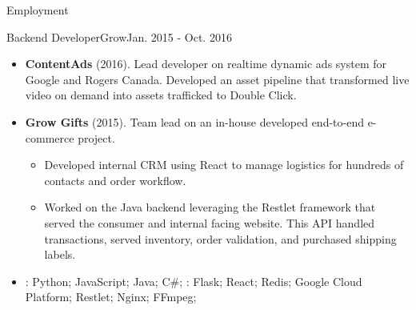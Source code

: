 \documentclass[]{mcdowellcv}
\begin{document}
\begin{cvsection}{Employment}
        \begin{cvsubsection}{Backend Developer}{Grow}{Jan. 2015 - Oct. 2016}
            \begin{itemize}
                \item \textbf{ContentAds} (2016). Lead developer on realtime dynamic ads system for Google and Rogers Canada. Developed an asset pipeline that transformed live video on demand into assets trafficked to Double Click.
            \end{itemize}
            \begin{itemize}
                \item \textbf{Grow Gifts} (2015). Team lead on an in-house developed end-to-end e-commerce project. 
                    \begin{itemize}
                         \item Developed internal CRM using React to manage logistics for hundreds of contacts and order workflow.
                         \item Worked on the Java backend leveraging the Restlet framework that served the consumer and internal facing website. This API handled transactions, served inventory, order validation, and purchased shipping labels.
                    \end{itemize}
            \end{itemize}
            \begin{itemize}
                 \item {}: Python; JavaScript; Java; C\#; \newline
                : Flask; React; Redis; Google Cloud Platform; Restlet; Nginx; FFmpeg;
            \end{itemize}
        \end{cvsubsection}
        \pagebreak
    \end{cvsection}
\end{document}

